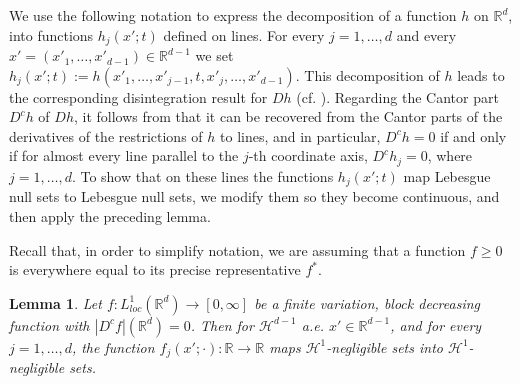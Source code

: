 \documentclass[12pt]{amsart}
\numberwithin{equation}{section}
\theoremstyle{plain}
\newtheorem{lemma}[theorem]{Lemma}
\theoremstyle{definition}
\theoremstyle{remark}
\begin{document}
We use the following notation to express the  decomposition of a function $h$ on
$\mathbb{R}^d$,
 into functions $h_j(x'; t)$ defined on lines. For every $j=1,\ldots,d$ and every $x'=(x'_1,\ldots,x'_{d-1})\in
  \mathbb{R}^{d-1}$ we  set
  $h_j(x';t):=h(x'_1,\ldots,x'_{j-1},t,x'_j,\ldots,x'_{d-1})$.  This decomposition of $h$ leads to the corresponding disintegration
  result for $Dh$ (cf. \cite{AFP}). Regarding the Cantor part $D^c h$ of
$Dh$, it follows from \cite[Theorem 3.108]{AFP} that
it can be recovered from the Cantor parts of the derivatives of
the restrictions of $h$ to lines, and in particular, $D^c h = 0$
if and only if for almost every line parallel to the $j$-th coordinate axis,
$D^c h_j = 0$, where $j=1,\ldots,d$. To show that on these lines the functions $h_j(x'; t)$ map Lebesgue null sets to
Lebesgue null sets, we modify them so they become continuous, and then apply the preceding lemma.

Recall
  that, in order to simplify notation, we are assuming that
  a function $f\ge 0$ is everywhere equal to its precise representative
$f^*$.

\begin{lemma} \label{fn0to0}
  Let $f: L^1_{loc}(\mathbb{R}^d)\to [0,\infty]$ be a  finite variation,
  block decreasing function with $|D^cf|(\mathbb{R}^d)=0$. Then for $\mathcal{H}^{d-1}$ a.e. $x'\in \mathbb{R}^{d-1}$, and for every $j=1,\ldots,d$, the function $f_j(x';\cdot):\mathbb{R}\to \mathbb{R}$ maps $\mathcal{H}^{1}$-negligible sets into $\mathcal{H}^{1}$-negligible sets.
\end{lemma}
\end{document}
